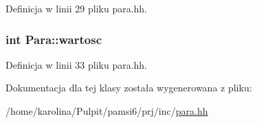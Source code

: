 Definicja w linii 29 pliku para.\-hh.

\hypertarget{class_para_a0c99183281c295298b3fb99f8795a591}{
\subsubsection[{wartosc}]{\setlength{\rightskip}{0pt plus 5cm}int Para\-::wartosc}}\label{class_para_a0c99183281c295298b3fb99f8795a591}


Definicja w linii 33 pliku para.\-hh.



Dokumentacja dla tej klasy została wygenerowana z pliku\-:\begin{DoxyCompactItemize}
\item 
/home/karolina/\-Pulpit/pamsi6/prj/inc/\hyperlink{para_8hh}{para.\-hh}\end{DoxyCompactItemize}
